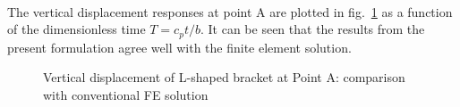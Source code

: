 \paragraph{}
The vertical displacement responses at point A are plotted in fig.~\ref{fig:l_uy_dynamic_at_A} as a function of the dimensionless
    time $T = c_pt/b$.
It can be seen that the results from the present formulation agree well with the finite element solution.
    \begin{figure}
        \centering
    \caption{Vertical displacement of L-shaped bracket at Point A: comparison with conventional FE solution}
    \label{fig:l_uy_dynamic_at_A}
    \end{figure}

\pagebreak